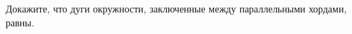 \begin{ex}
	\begin{condition}
		Докажите, что дуги окружности, заключенные между параллельными хордами, равны.
	\end{condition}
\end{ex}